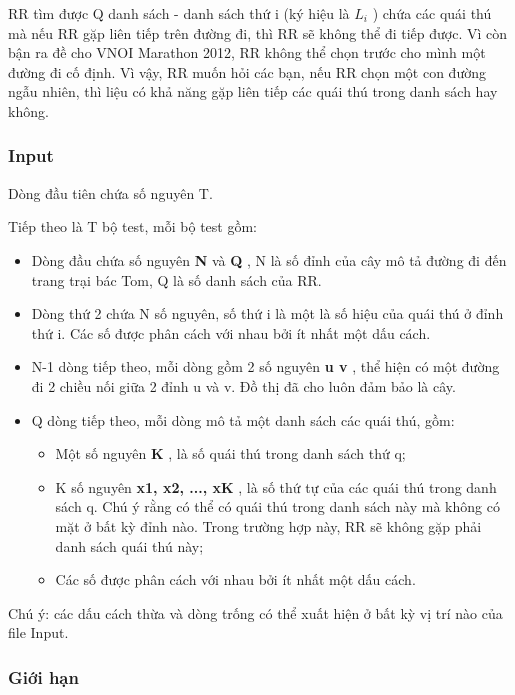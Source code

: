 RR tìm được Q danh sách - danh sách thứ i (ký hiệu là $L_{i}$ ) chứa các quái thú mà nếu RR gặp liên tiếp trên đường đi, thì RR sẽ không thể đi tiếp được. Vì còn bận ra đề cho VNOI Marathon 2012, RR không thể chọn trước cho mình một đường đi cố định. Vì vậy, RR muốn hỏi các bạn, nếu RR chọn một con đường ngẫu nhiên, thì liệu có khả năng gặp liên tiếp các quái thú trong danh sách hay không.

\subsubsection{Input}

Dòng đầu tiên chứa số nguyên T.

Tiếp theo là T bộ test, mỗi bộ test gồm:
\begin{itemize}
	\item Dòng đầu chứa số nguyên \textbf{ N } và \textbf{ Q } , N là số đỉnh của cây mô tả đường đi đến trang trại bác Tom, Q là số danh sách của RR.
	\item Dòng thứ 2 chứa N số nguyên, số thứ i là một là số hiệu của quái thú ở đỉnh thứ i. Các số được phân cách với nhau bởi ít nhất một dấu cách.
	\item N-1 dòng tiếp theo, mỗi dòng gồm 2 số nguyên \textbf{ u v } , thể hiện có một đường đi 2 chiều nối giữa 2 đỉnh u và v. Đồ thị đã cho luôn đảm bảo là cây.
	\item Q dòng tiếp theo, mỗi dòng mô tả một danh sách các quái thú, gồm:
\begin{itemize}
	\item Một số nguyên \textbf{ K } , là số quái thú trong danh sách thứ q;
	\item K số nguyên \textbf{ x1, x2, ..., xK } , là số thứ tự của các quái thú trong danh sách q. Chú ý rằng có thể có quái thú trong danh sách này mà không có mặt ở bất kỳ đỉnh nào. Trong trường hợp này, RR sẽ không gặp phải danh sách quái thú này;
\end{itemize}
\begin{itemize}
	\item Các số được phân cách với nhau bởi ít nhất một dấu cách.
\end{itemize}
\end{itemize}

Chú ý: các dấu cách thừa và dòng trống có thể xuất hiện ở bất kỳ vị trí nào của file Input.

\subsubsection{Giới hạn}


